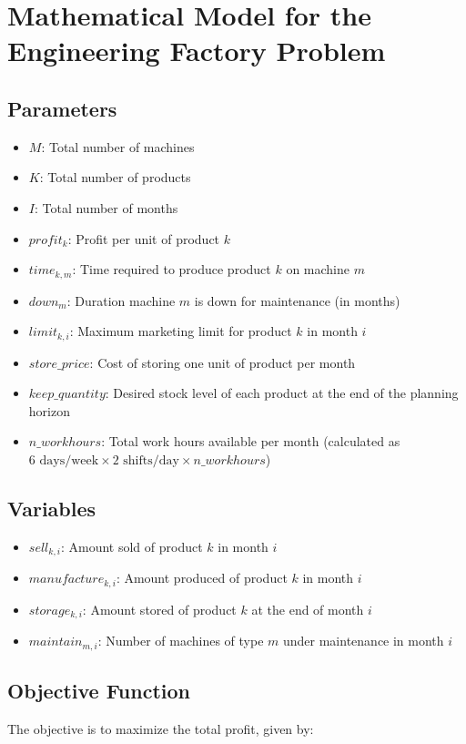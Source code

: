 \documentclass{article}
\begin{document}
\section*{Mathematical Model for the Engineering Factory Problem}

\subsection*{Parameters}
\begin{itemize}
    \item $M$: Total number of machines
    \item $K$: Total number of products
    \item $I$: Total number of months
    \item $profit_k$: Profit per unit of product $k$
    \item $time_{k,m}$: Time required to produce product $k$ on machine $m$
    \item $down_m$: Duration machine $m$ is down for maintenance (in months)
    \item $limit_{k,i}$: Maximum marketing limit for product $k$ in month $i$
    \item $store\_price$: Cost of storing one unit of product per month
    \item $keep\_quantity$: Desired stock level of each product at the end of the planning horizon
    \item $n\_workhours$: Total work hours available per month (calculated as $6 \text{ days/week} \times 2 \text{ shifts/day} \times n\_workhours$)
\end{itemize}

\subsection*{Variables}
\begin{itemize}
    \item $sell_{k,i}$: Amount sold of product $k$ in month $i$
    \item $manufacture_{k,i}$: Amount produced of product $k$ in month $i$
    \item $storage_{k,i}$: Amount stored of product $k$ at the end of month $i$
    \item $maintain_{m,i}$: Number of machines of type $m$ under maintenance in month $i$
\end{itemize}

\subsection*{Objective Function}
The objective is to maximize the total profit, given by:
\end{document}
